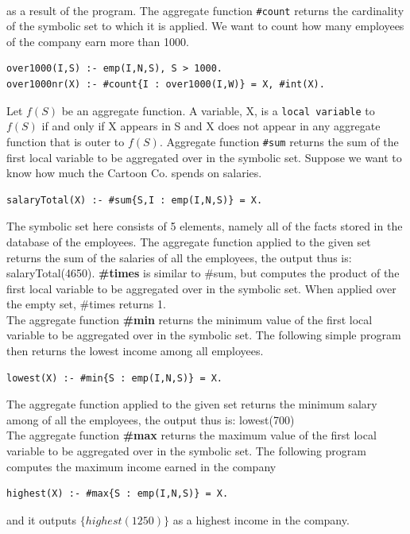 \documentclass[14pt,a4paper, titlepage]{article}
\begin{document}
\\as a result of the program.
The aggregate function \texttt{\#count} returns the cardinality of the symbolic set to which it is applied. We want to count how many employees of the company earn more than 1000. 
\begin{lstlisting}
over1000(I,S) :- emp(I,N,S), S > 1000.
over1000nr(X) :- #count{I : over1000(I,W)} = X, #int(X).
\end{lstlisting}
\bigskip Let $f(S)$ be an aggregate function. A variable, X, is a \texttt{local variable} to $f(S)$ if and only if X appears in S and X does not appear in any aggregate function that is outer to $f(S)$. Aggregate function \texttt{\#sum} returns the sum of the first local variable to be aggregated over in the symbolic set. Suppose we want to know how much the Cartoon Co. spends on salaries.
\begin{lstlisting}
salaryTotal(X) :- #sum{S,I : emp(I,N,S)} = X.
\end{lstlisting}
The symbolic set here consists of 5 elements, namely all of the facts stored in the database of the employees. The aggregate function applied to the given set returns the sum of the salaries of all the employees, the output thus is:
{salaryTotal(4650)}. \textbf{\#times} is similar to \#sum, but computes the product of the first local variable to be aggregated over in the symbolic set. When applied over the empty set, \#times returns 1.
\bigskip \\The aggregate function \textbf{\#min} returns the minimum value of the first local variable to be aggregated over in the symbolic set. The following simple program then returns the lowest income among all employees.
\begin{lstlisting}
lowest(X) :- #min{S : emp(I,N,S)} = X.
\end{lstlisting}
The aggregate function applied to the given set returns the minimum salary among of all the employees, the output thus is:
{lowest(700)}
\bigskip \\ The aggregate function \textbf{\#max} returns the maximum value of the first local variable to be aggregated over in the symbolic set. The following program computes the maximum income earned in the company
\begin{lstlisting}
highest(X) :- #max{S : emp(I,N,S)} = X.
\end{lstlisting}
and it outputs $\{highest(1250)\}$ as a highest income in the company.
\end{document}
